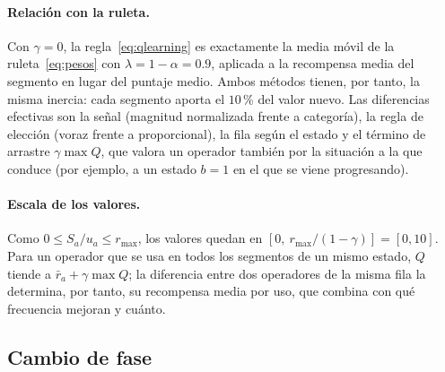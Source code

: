 \begin{algorithm}[H]
\caption{Aprendizaje por Q-learning ( y )}
\label{alg:ql-apr}
\end{algorithm}

\paragraph{Relación con la ruleta.} Con $\gamma=0$, la regla~\eqref{eq:qlearning} es
exactamente la media móvil de la ruleta~\eqref{eq:pesos} con $\lambda=1-\alpha=0.9$, aplicada
a la recompensa media del segmento en lugar del puntaje medio. Ambos métodos tienen, por
tanto, la misma inercia: cada segmento aporta el $10$\,\% del valor nuevo. Las diferencias
efectivas son la señal (magnitud normalizada frente a categoría), la regla de elección
(voraz frente a proporcional), la fila según el estado y el término de arrastre $\gamma\max Q$,
que valora un operador también por la situación a la que conduce (por ejemplo, a un estado
$b=1$ en el que se viene progresando).

\paragraph{Escala de los valores.} Como $0\le S_a/u_a\le r_{\max}$, los valores quedan en
$[0,\ r_{\max}/(1-\gamma)]=[0,10]$. Para un operador que se usa en todos los segmentos de un
mismo estado, $Q$ tiende a $\bar{r}_a+\gamma\max Q$; la diferencia entre dos operadores de la
misma fila la determina, por tanto, su recompensa media por uso, que combina con qué
frecuencia mejoran y cuánto.

\subsection{Cambio de fase}
\label{sec:ql-fase2}

